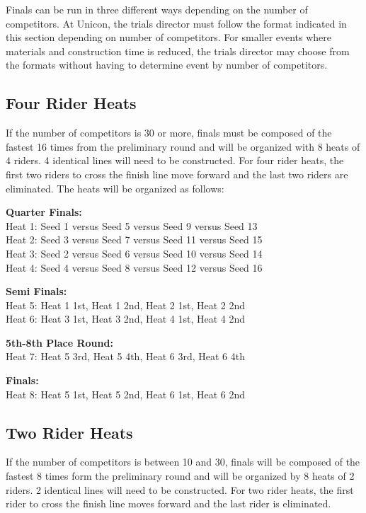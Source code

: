 Finals can be run in three different ways depending on the number of competitors.
At Unicon, the trials director must follow the format indicated in this section depending on number of competitors.
For smaller events where materials and construction time is reduced, the trials director may choose from the formats without having to determine event by number of competitors.

\subsection{Four Rider Heats}

If the number of competitors is 30 or more, finals must be composed of the fastest 16 times from the preliminary round and will be organized with 8 heats of 4 riders.
4 identical lines will need to be constructed.
For four rider heats, the first two riders to cross the finish line move forward and the last two riders are eliminated.
The heats will be organized as follows:

\textbf{Quarter Finals:}\\
Heat 1: Seed 1 versus Seed 5 versus Seed 9 versus Seed 13\\
Heat 2: Seed 3 versus Seed 7 versus Seed 11 versus Seed 15\\
Heat 3: Seed 2 versus Seed 6 versus Seed 10 versus Seed 14\\
Heat 4: Seed 4 versus Seed 8 versus Seed 12 versus Seed 16

\textbf{Semi Finals:}\\
Heat 5: Heat 1 1st, Heat 1 2nd, Heat 2 1st, Heat 2 2nd\\
Heat 6: Heat 3 1st, Heat 3 2nd, Heat 4 1st, Heat 4 2nd

\textbf{5th-8th Place Round:}\\
Heat 7: Heat 5 3rd, Heat 5 4th, Heat 6 3rd, Heat 6 4th

\textbf{Finals:}\\
Heat 8: Heat 5 1st, Heat 5 2nd, Heat 6 1st, Heat 6 2nd

\subsection{Two Rider Heats}

If the number of competitors is between 10 and 30, finals will be composed of the fastest 8 times form the preliminary round and will be organized by 8 heats of 2 riders.
2 identical lines will need to be constructed.
For two rider heats, the first rider to cross the finish line moves forward and the last rider is eliminated.

